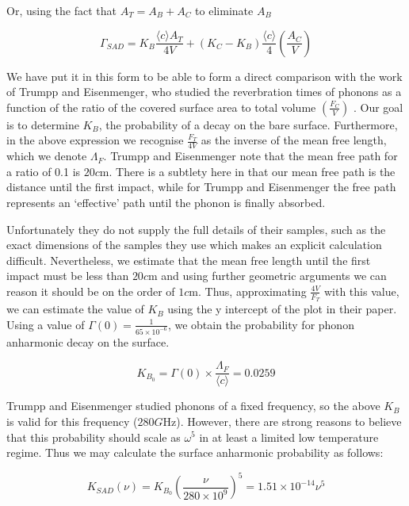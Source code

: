\documentclass[11pt]{article}
\newcommand{\e}[1]{\times 10^{#1}}
\begin{document}
 Or, using the fact that $A_T = A_B + A_C$ to eliminate $A_B$
 
 \begin{equation}
 \Gamma_{SAD} = K_B \frac{\langle c \rangle A_T}{4V} + (K_C - K_B)\frac{\langle c \rangle}{4} \left(\frac{A_C}{V}\right)
 \end{equation}
 
 We have put it in this form to be able to form a direct comparison with the work of Trumpp and Eisenmenger, who studied the reverbration 
 times of phonons as a function of the ratio of the covered surface area to total volume $\left(\frac{F_C}{V}\right)$ \cite{4}. Our goal is to determine
 $K_B$, the probability of a decay on the bare surface. Furthermore, in the 
 above expression we recognise $\frac{F_T}{4V}$ as the inverse of the mean free length, which we denote $\Lambda_F$.  Trumpp and Eisenmenger 
 note that the mean free path for a ratio of 0.1 is $20\si{c\meter}$. There is a subtlety here in that our mean free path is the distance until 
 the first impact, while for Trumpp and Eisenmenger the free path represents an `effective' path until the phonon is finally absorbed. 
 
 Unfortunately they do not supply the full details of their samples, such as the exact dimensions of the samples they use which makes an 
 explicit calculation difficult. Nevertheless, we estimate that the mean free length until the first impact must be less than $20\si{c\meter}$ and
 using further geometric arguments we can reason it should be on the order of $1 \si{c\meter}$. Thus, approximating $\frac{4V}{F_T}$ with this
 value, we can estimate the value of $K_B$ using the y intercept of the plot in their paper. Using a value of $\Gamma(0) = \frac{1}{65 \times 10^{-6}}$, we obtain the probability for phonon anharmonic decay on the surface.
 
 \begin{equation}
 K_{B_0} = \Gamma(0) \times \frac{\Lambda_F}{\langle c \rangle} = 0.0259
\end{equation}  
 
Trumpp and Eisenmenger studied phonons of a fixed frequency, so the above $K_B$ is valid for this frequency ($280\si{G\hertz}$). However,
there are strong reasons to believe that this probability should scale as $\omega^5$ in at least a limited low temperature regime. Thus we 
may calculate the surface anharmonic probability as follows:

\begin{equation}
K_{SAD}(\nu) = K_{B_0} \left(\frac{\nu}{280 \times 10^{9}}\right)^5 =  1.51\e{-14} \nu^5
\end{equation}
 
\end{document}
